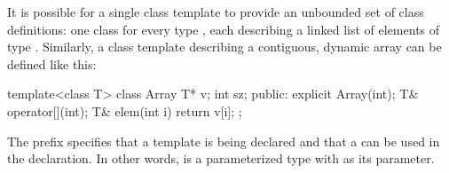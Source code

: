 \pnum
\begin{example}
It is possible for a single class template
to provide an unbounded set of class definitions:
one class  for every type ,
each describing a linked list of elements of type .
Similarly, a class template  describing a contiguous,
dynamic array can be defined like this:
\begin{codeblock}
template<class T> class Array {
  T* v;
  int sz;
public:
  explicit Array(int);
  T& operator[](int);
  T& elem(int i) { return v[i]; }
};
\end{codeblock}
The prefix 
specifies that a template is being declared and that a
 
can be used in the declaration.
In other words,
is a parameterized type with
as its parameter.
\end{example}

